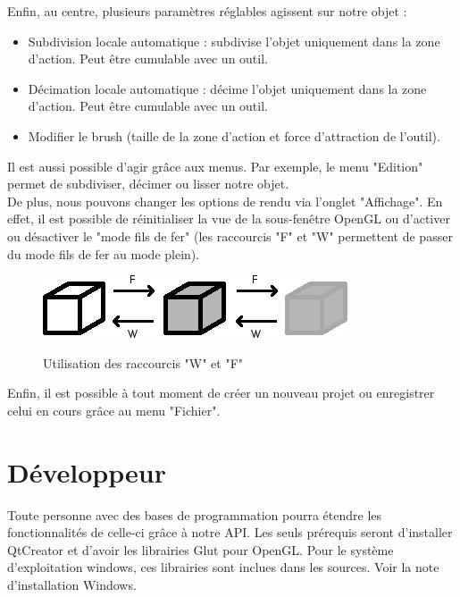 \documentclass[a4paper]{memoir}
\begin{document}
			Enfin, au centre, plusieurs paramètres réglables agissent sur notre objet : 
			\begin{itemize}
				\item Subdivision locale automatique : subdivise l'objet uniquement dans la zone d'action. Peut être cumulable avec un outil.
				\item Décimation locale automatique : décime l'objet uniquement dans la zone d'action. Peut être cumulable avec un outil.
				\item Modifier le brush (taille de la zone d'action et force d'attraction de l'outil).
			\end{itemize}
			Il est aussi possible d'agir grâce aux menus. Par exemple, le menu "Edition" permet de subdiviser, décimer ou lisser notre objet.\\
			De plus, nous pouvons changer les options de rendu via l'onglet "Affichage". En effet, il est possible de réinitialiser la vue de la 
			sous-fenêtre OpenGL ou d'activer ou désactiver le "mode fils de fer" (les raccourcis "F" et "W" permettent de passer du mode fils de fer 
			au mode plein).
			\begin{figure}[H]
				\begin{center}
					\includegraphics[scale=0.8]{img/wire-fill.png}
					\label{fig:wire-fill}
					\caption{Utilisation des raccourcis "W" et "F"}
				\end{center}
			\end{figure}
			Enfin, il est possible à tout moment de créer un nouveau projet ou enregistrer celui en cours grâce au menu "Fichier".

		\section{Développeur}
			Toute personne avec des bases de programmation pourra étendre les fonctionnalités de celle-ci grâce à notre API. Les seuls prérequis seront 
			d'installer QtCreator et d'avoir les librairies Glut pour OpenGL. Pour le système d'exploitation windows, ces librairies sont inclues dans les sources. Voir la note d'installation Windows.
			
\end{document}
